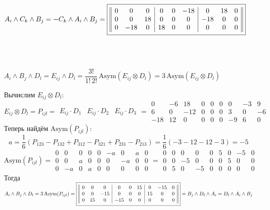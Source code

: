 \documentclass{article}
\newcommand*\squared[1]{\tikz[baseline=(char.base)]{
            \node[shape=rectangle,draw,inner sep=4pt] (char) {#1};}}
\begin{document}
\begin{center}
$A_i \wedge C_k \wedge B_j = - C_k \wedge A_i \wedge B_j = \squared{$\begin{array}{||ccc|ccc|ccc||}
0 & 0 & 0 & 0 & 0 & -18 & 0 & 18 & 0 \\
0 & 0 & 18 & 0 & 0 & 0 & -18 & 0 & 0 \\
0 & -18 & 0 & 18 & 0 & 0 & 0 & 0 & 0
\end{array}$}$
\end{center}
\, \\ \, \\
\begin{center}
$A_i \wedge B_j \wedge D_l = E_{ij} \wedge D_l = \dfrac{3!}{1!\,2!}\,\text{Asym}(E_{ij}\otimes D_l) = 3\,\text{Asym}(E_{ij}\otimes D_l)$
\end{center}
Вычислим $E_{ij}\otimes D_l$:
$$E_{ij}\otimes D_l = P_{ijl} = \begin{array}{||c|c|c||}
E_{ij}\cdot D_1 & E_{ij}\cdot D_2 & E_{ij}\cdot D_3
\end{array} = \begin{array}{||ccc|ccc|ccc||}
0 & -6 & 18 & 0 & 0 & 0 & 0 & -3 & 9 \\
6 & 0 & -12 & 0 & 0 & 0 & 3 & 0 & -6 \\
-18 & 12 & 0 & 0 & 0 & 0 & -9 & 6 & 0
\end{array}$$
Теперь найдём $\text{Asym}(P_{ijl})$:
$$a = \frac{1}{6}(P_{123} - P_{132} + P_{312} - P_{321} + P_{231} - P_{213}) = \frac{1}{6}(-3 -12 -12 -3) = -5$$
$$\text{Asym}(P_{ijl}) = \begin{array}{||ccc|ccc|ccc||}
0 & 0 & 0 & 0 & 0 & -a & 0 & a & 0 \\
0 & 0 & a & 0 & 0 & 0 & -a & 0 & 0 \\
0 & -a & 0 & a & 0 & 0 & 0 & 0 & 0
\end{array} =  \begin{array}{||ccc|ccc|ccc||}
0 & 0 & 0 & 0 & 0 & 5 & 0 & -5 & 0 \\
0 & 0 & -5 & 0 & 0 & 0 & 5 & 0 & 0 \\
0 & 5 & 0 & -5 & 0 & 0 & 0 & 0 & 0
\end{array}$$
Тогда $A_i \wedge B_j \wedge D_l = 3\,\text{Asym}(P_{ijl}) = \squared{$\begin{array}{||ccc|ccc|ccc||}
0 & 0 & 0 & 0 & 0 & 15 & 0 & -15 & 0 \\
0 & 0 & -15 & 0 & 0 & 0 & 15 & 0 & 0 \\
0 & 15 & 0 & -15 & 0 & 0 & 0 & 0 & 0
\end{array}$} =  B_j \wedge D_l \wedge A_i = D_l \wedge A_i \wedge B_j$
\end{document}
